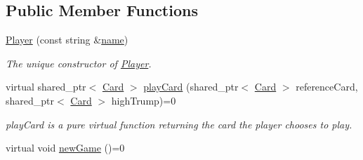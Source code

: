 \subsection*{Public Member Functions}
\begin{DoxyCompactItemize}
\item 
\hyperlink{classPlayer_a5a2790fccf10c30106370d910c96d317}{Player} (const string \&\hyperlink{classPlayer_acf0355128a99ee20ad9931b760fb2de1}{name})
\begin{DoxyCompactList}\small\item\em The unique constructor of \hyperlink{classPlayer}{Player}. \end{DoxyCompactList}\item 
virtual shared\-\_\-ptr$<$ \hyperlink{classCard}{Card} $>$ \hyperlink{classPlayer_aeba090a124bfd9a3666d2d793439cae0}{play\-Card} (shared\-\_\-ptr$<$ \hyperlink{classCard}{Card} $>$ reference\-Card, shared\-\_\-ptr$<$ \hyperlink{classCard}{Card} $>$ high\-Trump)=0
\begin{DoxyCompactList}\small\item\em play\-Card is a pure virtual function returning the card the player chooses to play. \end{DoxyCompactList}\item 
\hypertarget{classPlayer_a76a707ceb6f24b0a2a801434ee5a60ad}{virtual void \hyperlink{classPlayer_a76a707ceb6f24b0a2a801434ee5a60ad}{new\-Game} ()=0}\label{classPlayer_a76a707ceb6f24b0a2a801434ee5a60ad}


\end{DoxyCompactItemize}
